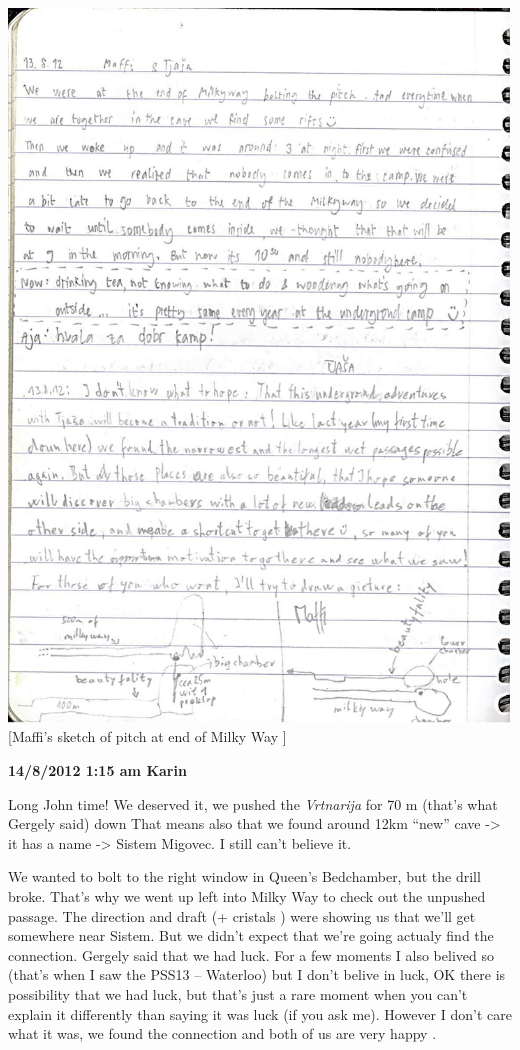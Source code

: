 \includegraphics{UgLog1012/90.jpeg}\\
{[}Maffi's sketch of pitch at end of Milky Way {]}

\textbf{14/8/2012 1:15 am Karin}

Long John time! We deserved it, we pushed the \emph{Vrtnarija} for 70 m
(that's what Gergely said) down That means also that we found around
12km ``new'' cave -\textgreater{} it has a name -\textgreater{} Sistem
Migovec. I still can't believe it.

We wanted to bolt to the right window in Queen's Bedchamber, but the
drill broke. That's why we went up left into Milky Way to check out the
unpushed passage. The direction and draft (+ cristals ) were showing us
that we'll get somewhere near Sistem. But we didn't expect that we're
going actualy find the connection. Gergely said that we had luck. For a
few moments I also belived so (that's when I saw the PSS13 -- Waterloo)
but I don't belive in luck, OK there is possibility that we had luck,
but that's just a rare moment when you can't explain it differently than
saying it was luck (if you ask me). However I don't care what it was, we
found the connection and both of us are very happy .

